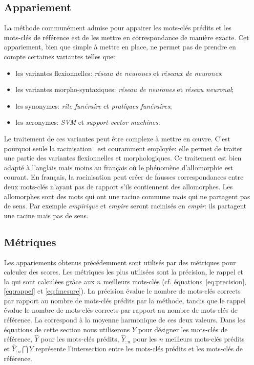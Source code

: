\subsection{Appariement}\label{sub:framework_pairing}
La méthode communément admise pour appairer les mots-clés prédits et les mots-clés de référence est de les mettre en correspondance de manière exacte. Cet appariement, bien que simple à mettre en place, ne permet pas de prendre en compte certaines variantes telles que:
\begin{itemize}
    \item les variantes flexionnelles: \textit{réseau de neurones} et \textit{réseaux de neurones};
    \item les variantes morpho-syntaxiques: \textit{réseau de neurones} et \textit{réseau neuronal};
    \item les synonymes: \textit{rite funéraire} et \textit{pratiques funéraires};
    \item les acronymes: \textit{SVM} et \textit{support vector machines}.
\end{itemize}

Le traitement de ces variantes peut être complexe à mettre en \oe{}uvre. C'est pourquoi seule la racinisation~\cite{porter_algorithm_1980} est couramment employée: elle permet de traiter une partie des variantes flexionnelles et morphologiques.
Ce traitement est bien adapté à l'anglais mais moins au français où le phénomène d'allomorphie est courant.
En français, la racinisation peut créer de fausses correspondances entre deux mots-clés n'ayant pas de rapport s'ils contiennent des allomorphes.
Les allomorphes sont des mots qui ont une racine commune mais qui ne partagent pas de sens.
Par exemple \textit{empirique} et \textit{empire} seront racinisés en \emph{empir}: ils partagent une racine mais pas de sens.


\subsection{Métriques}\label{sub:framework_metrics}

Les appariements obtenus précédemment sont utilisés par des métriques pour calculer des scores.
Les métriques les plus utilisées sont la précision, le rappel et la \fmesure{} qui sont calculées grâce aux $n$ meilleurs mots-clés (cf. équations~\ref{eq:precision}, \ref{eq:rappel} et \ref{eq:fmesure}). 
La précision évalue le nombre de mots-clés corrects par rapport au nombre de mots-clés prédits par la méthode, tandis que le rappel évalue le nombre de mots-clés corrects par rapport au nombre de mots-clés de référence. La \fmesure{} correspond à la moyenne harmonique de ces deux valeurs.
Dans les équations de cette section nous utiliserons $Y$ pour désigner les mots-clés de référence, $\hat{Y}$ pour les mots-clés prédits, $\hat{Y}_{:n}$ pour les $n$ meilleurs mots-clés prédits et $\hat{Y}_{:n} \bigcap Y$ représente l'intersection entre les mots-clés prédits et les mots-clés de référence.

